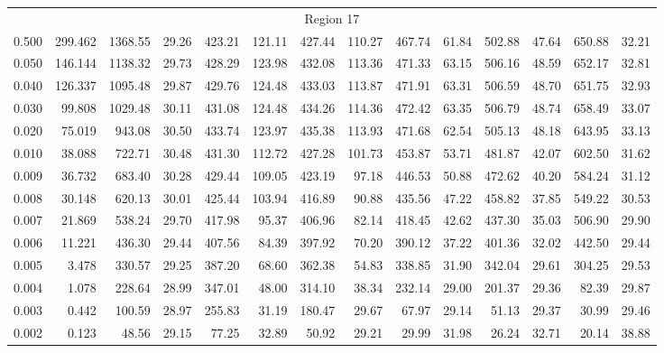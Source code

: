 \begin{tabular}{@{}lrrrrrrrrrrrrr@{}}
\midrule
\multicolumn{14}{c}{Region 17} \\
\cmidrule{1-14}
0.500 & 299.462 & 1368.55 & 29.26 & 423.21 & 121.11 & 427.44 & 110.27 & 467.74 & 61.84 & 502.88 & 47.64 & 650.88 & 32.21 \\
0.050 & 146.144 & 1138.32 & 29.73 & 428.29 & 123.98 & 432.08 & 113.36 & 471.33 & 63.15 & 506.16 & 48.59 & 652.17 & 32.81 \\
0.040 & 126.337 & 1095.48 & 29.87 & 429.76 & 124.48 & 433.03 & 113.87 & 471.91 & 63.31 & 506.59 & 48.70 & 651.75 & 32.93 \\
0.030 & 99.808 & 1029.48 & 30.11 & 431.08 & 124.48 & 434.26 & 114.36 & 472.42 & 63.35 & 506.79 & 48.74 & 658.49 & 33.07 \\
0.020 & 75.019 & 943.08 & 30.50 & 433.74 & 123.97 & 435.38 & 113.93 & 471.68 & 62.54 & 505.13 & 48.18 & 643.95 & 33.13 \\
0.010 & 38.088 & 722.71 & 30.48 & 431.30 & 112.72 & 427.28 & 101.73 & 453.87 & 53.71 & 481.87 & 42.07 & 602.50 & 31.62 \\
0.009 & 36.732 & 683.40 & 30.28 & 429.44 & 109.05 & 423.19 & 97.18 & 446.53 & 50.88 & 472.62 & 40.20 & 584.24 & 31.12 \\
0.008 & 30.148 & 620.13 & 30.01 & 425.44 & 103.94 & 416.89 & 90.88 & 435.56 & 47.22 & 458.82 & 37.85 & 549.22 & 30.53 \\
0.007 & 21.869 & 538.24 & 29.70 & 417.98 & 95.37 & 406.96 & 82.14 & 418.45 & 42.62 & 437.30 & 35.03 & 506.90 & 29.90 \\
0.006 & 11.221 & 436.30 & 29.44 & 407.56 & 84.39 & 397.92 & 70.20 & 390.12 & 37.22 & 401.36 & 32.02 & 442.50 & 29.44 \\
0.005 & 3.478 & 330.57 & 29.25 & 387.20 & 68.60 & 362.38 & 54.83 & 338.85 & 31.90 & 342.04 & 29.61 & 304.25 & 29.53 \\
0.004 & 1.078 & 228.64 & 28.99 & 347.01 & 48.00 & 314.10 & 38.34 & 232.14 & 29.00 & 201.37 & 29.36 & 82.39 & 29.87 \\
0.003 & 0.442 & 100.59 & 28.97 & 255.83 & 31.19 & 180.47 & 29.67 & 67.97 & 29.14 & 51.13 & 29.37 & 30.99 & 29.46 \\
0.002 & 0.123 & 48.56 & 29.15 & 77.25 & 32.89 & 50.92 & 29.21 & 29.99 & 31.98 & 26.24 & 32.71 & 20.14 & 38.88 \\

\bottomrule
\end{tabular}
